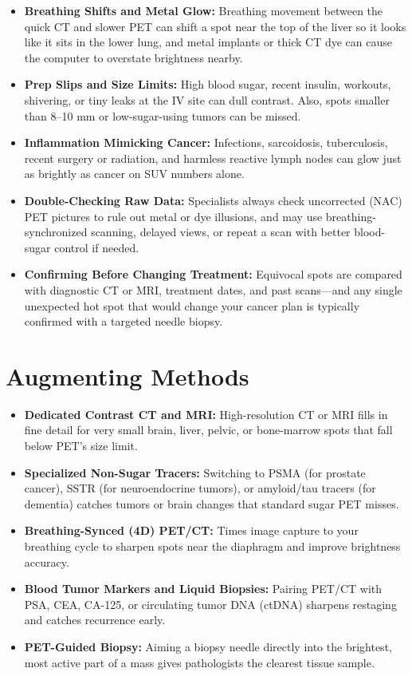 \begin{itemize}
    \item \textbf{Breathing Shifts and Metal Glow:} Breathing movement between the quick CT and slower PET can shift a spot near the top of the liver so it looks like it sits in the lower lung, and metal implants or thick CT dye can cause the computer to overstate brightness nearby.
    \item \textbf{Prep Slips and Size Limits:} High blood sugar, recent insulin, workouts, shivering, or tiny leaks at the IV site can dull contrast. Also, spots smaller than 8--10 mm or low-sugar-using tumors can be missed.
    \item \textbf{Inflammation Mimicking Cancer:} Infections, sarcoidosis, tuberculosis, recent surgery or radiation, and harmless reactive lymph nodes can glow just as brightly as cancer on SUV numbers alone.
    \item \textbf{Double-Checking Raw Data:} Specialists always check uncorrected (NAC) PET pictures to rule out metal or dye illusions, and may use breathing-synchronized scanning, delayed views, or repeat a scan with better blood-sugar control if needed.
    \item \textbf{Confirming Before Changing Treatment:} Equivocal spots are compared with diagnostic CT or MRI, treatment dates, and past scans---and any single unexpected hot spot that would change your cancer plan is typically confirmed with a targeted needle biopsy.
\end{itemize}

\section{Augmenting Methods}

\begin{itemize}
    \item \textbf{Dedicated Contrast CT and MRI:} High-resolution CT or MRI fills in fine detail for very small brain, liver, pelvic, or bone-marrow spots that fall below PET's size limit.
    \item \textbf{Specialized Non-Sugar Tracers:} Switching to PSMA (for prostate cancer), SSTR (for neuroendocrine tumors), or amyloid/tau tracers (for dementia) catches tumors or brain changes that standard sugar PET misses.
    \item \textbf{Breathing-Synced (4D) PET/CT:} Times image capture to your breathing cycle to sharpen spots near the diaphragm and improve brightness accuracy.
    \item \textbf{Blood Tumor Markers and Liquid Biopsies:} Pairing PET/CT with PSA, CEA, CA-125, or circulating tumor DNA (ctDNA) sharpens restaging and catches recurrence early.
    \item \textbf{PET-Guided Biopsy:} Aiming a biopsy needle directly into the brightest, most active part of a mass gives pathologists the clearest tissue sample.
\end{itemize}

